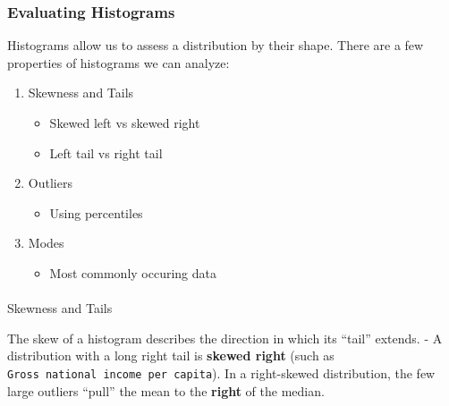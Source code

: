 \documentclass[
  letterpaper,
  DIV=11,
  numbers=noendperiod]{scrreprt}
\makeatletter
\let\oldparagraph\paragraph
\renewcommand{\paragraph}{
    \@ifstar
      \xxxParagraphStar
      \xxxParagraphNoStar
  }
\newcommand{\xxxParagraphStar}[1]{\oldparagraph*{#1}\mbox{}}
\newcommand{\xxxParagraphNoStar}[1]{\oldparagraph{#1}\mbox{}}
\newenvironment{Shaded}{\begin{snugshade}}{\end{snugshade}}
\newcommand{\NormalTok}[1]{\textcolor[rgb]{0.00,0.23,0.31}{#1}}
\newcommand{\OperatorTok}[1]{\textcolor[rgb]{0.37,0.37,0.37}{#1}}
\newcommand{\StringTok}[1]{\textcolor[rgb]{0.13,0.47,0.30}{#1}}
\providecommand{\tightlist}{%
  \setlength{\itemsep}{0pt}\setlength{\parskip}{0pt}}\usepackage{longtable,booktabs,array}
\makeatother
\begin{document}
\subsubsection{Evaluating Histograms}\label{evaluating-histograms}

Histograms allow us to assess a distribution by their shape. There are a
few properties of histograms we can analyze:

\begin{enumerate}
\def\labelenumi{\arabic{enumi}.}
\tightlist
\item
  Skewness and Tails

  \begin{itemize}
  \tightlist
  \item
    Skewed left vs skewed right
  \item
    Left tail vs right tail
  \end{itemize}
\item
  Outliers

  \begin{itemize}
  \tightlist
  \item
    Using percentiles
  \end{itemize}
\item
  Modes

  \begin{itemize}
  \tightlist
  \item
    Most commonly occuring data
  \end{itemize}
\end{enumerate}

\paragraph{Skewness and Tails}\label{skewness-and-tails}

The skew of a histogram describes the direction in which its ``tail''
extends. - A distribution with a long right tail is \textbf{skewed
right} (such as \texttt{Gross\ national\ income\ per\ capita}). In a
right-skewed distribution, the few large outliers ``pull'' the mean to
the \textbf{right} of the median.

\begin{Shaded}
\end{Shaded}
\end{document}
